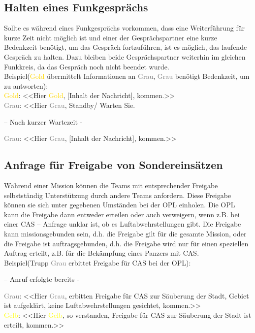 \subsection{Halten eines Funkgesprächs}
Sollte es während eines Funkgesprächs vorkommen, dass eine Weiterführung für kurze Zeit nicht möglich ist und einer der Gesprächspartner eine kurze Bedenkzeit benötigt, um das Gespräch fortzuführen, ist es möglich, das laufende Gespräch zu halten. Dazu bleiben beide Gesprächspartner weiterhin im gleichen Funkkreis, da das Gespräch noch nicht beendet wurde. \\
Beispiel(\textcolor{gold}{Gold} übermittelt Informationen an \textcolor{gray}{Grau}, \textcolor{gray}{Grau} benötigt Bedenkzeit, um zu antworten): \\
\textcolor{gold}{Gold}: <<Hier \textcolor{gold}{Gold}, [Inhalt der Nachricht], kommen.>> \\
\textcolor{gray}{Grau}: <<Hier \textcolor{gray}{Grau}, Standby/ Warten Sie. \\
\begin{center}
– Nach kurzer Wartezeit - \\
\end{center}
\textcolor{gray}{Grau}: <<Hier \textcolor{gray}{Grau}, [Inhalt der Nachricht], kommen.>> \\

\subsection{Anfrage für Freigabe von Sondereinsätzen}
Während einer Mission können die Teams mit entsprechender Freigabe selbstständig Unterstützung durch andere Teams anfordern. Diese Freigabe können sie sich unter gegebenen Umständen bei der \ac{OPL} einholen. Die \ac{OPL} kann die Freigabe dann entweder erteilen oder auch verweigern, wenn z.B. bei einer \ac{CAS} – Anfrage unklar ist, ob es Luftabwehrstellungen gibt. Die Freigabe kann missionsgebunden sein, d.h. die Freigabe gilt für die gesamte Mission, oder die Freigabe ist auftragsgebunden, d.h. die Freigabe wird nur für einen speziellen Auftrag erteilt, z.B. für die Bekämpfung eines Panzers mit \ac{CAS}. \\
Beispiel(Trupp \textcolor{gray}{Grau} erbittet Freigabe für \ac{CAS} bei der \ac{OPL}): \\
\begin{center}
– Anruf erfolgte bereits -
\end{center}
\textcolor{gray}{Grau}: <<Hier \textcolor{gray}{Grau}, erbitten Freigabe für \ac{CAS} zur Säuberung der Stadt, Gebiet ist aufgeklärt, keine Luftabwehrstellungen gesichtet, kommen.>> \\
\textcolor{yellow}{Gelb}: <<Hier \textcolor{yellow}{Gelb}, so verstanden, Freigabe für \ac{CAS} zur Säuberung der Stadt ist erteilt, kommen.>>\\

